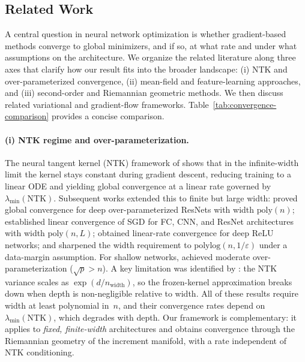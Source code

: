 \documentclass[twoside,11pt]{article}
\newcommand{\rev}[1]{#1}                           %
\begin{document}
\subsection{Related Work}
\rev{%
A central question in neural network optimization is whether gradient-based methods converge to global minimizers, and if so, at what rate and under what assumptions on the architecture.
We organize the related literature along three axes that clarify how our result fits into the broader landscape: (i) NTK and over-parameterized convergence, (ii) mean-field and feature-learning approaches, and (iii) second-order and Riemannian geometric methods.
We then discuss related variational and gradient-flow frameworks.
Table~\ref{tab:convergence-comparison} provides a concise comparison.

\paragraph{(i) NTK regime and over-parameterization.}
The neural tangent kernel (NTK) framework of \citet{jacot2018neural} shows that in the infinite-width limit the kernel stays constant during gradient descent, reducing training to a linear ODE and yielding global convergence at a linear rate governed by $\lambda_{\min}(\text{NTK})$.
Subsequent works extended this to finite but large width:
\citet{du2018gradient} proved global convergence for deep over-parameterized ResNets with width $\mathrm{poly}(n)$;
\citet{allen2018convergence} established linear convergence of SGD for FC, CNN, and ResNet architectures with width $\mathrm{poly}(n,L)$;
\citet{zou2019gradient} obtained linear-rate convergence for deep ReLU networks;
and \citet{chen2019much} sharpened the width requirement to $\mathrm{polylog}(n,1/\varepsilon)$ under a data-margin assumption.
For shallow networks, \citet{oymak2019moderate} achieved moderate over-parameterization ($\sqrt{p}>n$).
A key limitation was identified by \citet{hanin2019finite}: the NTK variance scales as $\exp(d/n_{\text{width}})$, so the frozen-kernel approximation breaks down when depth is non-negligible relative to width.
All of these results require width at least polynomial in~$n$, and their convergence rates depend on $\lambda_{\min}(\text{NTK})$, which degrades with depth.
Our framework is complementary: it applies to \emph{fixed, finite-width} architectures and obtains convergence through the Riemannian geometry of the increment manifold, with a rate independent of NTK conditioning.

}
\end{document}
